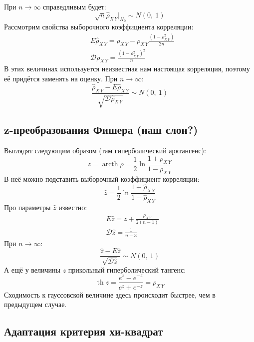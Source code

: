 \documentclass[12pt, a4paper]{article}
\newcommand{\dev}{\mathcal{D}}
\begin{document}
При $n \to \infty$ справедливым будет:
\[
\sqrt{n} \hat \rho_{X\, Y} \Big|_{H_0} \sim N(0,\ 1)
\]
Рассмотрим свойства выборочного коэффициента корреляции:
\begin{equation*}
    \begin{aligned}
        & E\hat \rho_{X\, Y} = \rho_{X\, Y} - \rho_{X\, Y} \frac{ (1 - \rho_{X\, Y}^2) }{2n}\\
        & \dev \rho_{X\, Y} = \frac{ {\left( 1 - \rho_{X\, Y}^2 \right)}^2 }{n}
    \end{aligned}
\end{equation*}
В этих величинах используется неизвестная нам настоящая корреляция, поэтому её придётся заменять на оценку. При $n \to \infty$:
\[
\frac{\hat \rho_{X\, Y} - E\hat \rho_{X\, Y}}{\sqrt{\dev \hat\rho_{X\, Y}}} \sim N(0,\ 1)
\]
\subsection*{z-преобразования Фишера (наш слон?)}
Выглядят следующим образом (там гиперболический арктангенс):
\[
z = \operatorname{arcth} \rho = \frac{1}{2} \ln \frac{1 + \rho_{X\, Y}}{1 - \rho_{X\, Y}}
\]
В неё можно подставить выборочный коэффициент корреляции:
\[
\hat z = \frac{1}{2} \ln \frac{1 + \hat \rho_{X\, Y}}{1 - \hat \rho_{X\, Y}}
\]
Про параметры $\hat z$ известно:
\begin{equation*}
    \begin{aligned}
        & E \hat z = z + \frac{\rho_{X\, Y}}{2 (n - 1)}\\
        & \dev \hat z = \frac{1}{n - 3}
    \end{aligned}
\end{equation*}
При $n \to \infty$:
\[
\frac{\hat z - E\hat z}{\sqrt{\dev \hat z}} \sim N(0,\ 1)
\]
А ещё у величины $z$ прикольный гиперболический тангенс:
\[
\operatorname{th} z = \frac{e^z - e^{-z}}{e^z + e^{-z}} = \rho_{X\, Y}
\]
Сходимость к гауссовской величине здесь происходит быстрее, чем в предыдущем случае.
\subsection*{Адаптация критерия хи-квадрат}
\end{document}
